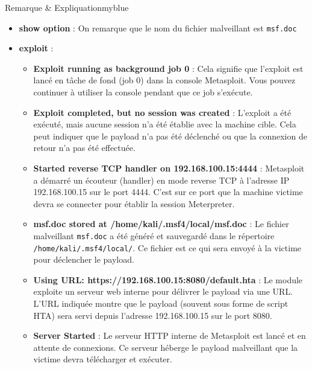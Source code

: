 \begin{prettyBox}{Remarque \& Expliquation}{myblue}
    \begin{itemize}
        \item \textbf{show option} : On remarque que le nom du fichier malveillant est \texttt{msf.doc} 
        \item \textbf{exploit} :
        \begin{itemize}
            \item \textbf{Exploit running as background job 0} :  
        Cela signifie que l'exploit est lancé en tâche de fond (job 0) dans la console Metasploit. Vous pouvez continuer à utiliser la console pendant que ce job s'exécute.
            \item \textbf{Exploit completed, but no session was created} :  
        L'exploit a été exécuté, mais aucune session n'a été établie avec la machine cible. Cela peut indiquer que le payload n'a pas été déclenché ou que la connexion de retour n'a pas été effectuée.
            \item \textbf{Started reverse TCP handler on 192.168.100.15:4444} :  
        Metasploit a démarré un écouteur (handler) en mode reverse TCP à l'adresse IP 192.168.100.15 sur le port 4444. C'est sur ce port que la machine victime devra se connecter pour établir la session Meterpreter.
            \item \textbf{msf.doc stored at /home/kali/.msf4/local/msf.doc} :  
        Le fichier malveillant \texttt{msf.doc} a été généré et sauvegardé dans le répertoire \texttt{/home/kali/.msf4/local/}. Ce fichier est ce qui sera envoyé à la victime pour déclencher le payload.
            \item \textbf{Using URL: https://192.168.100.15:8080/default.hta} :  
        Le module exploite un serveur web interne pour délivrer le payload via une URL. L'URL indiquée montre que le payload (souvent sous forme de script HTA) sera servi depuis l'adresse 192.168.100.15 sur le port 8080.
            \item \textbf{Server Started} :  
        Le serveur HTTP interne de Metasploit est lancé et en attente de connexions. Ce serveur héberge le payload malveillant que la victime devra télécharger et exécuter.        \end{itemize}
    \end{itemize}
\end{prettyBox}

